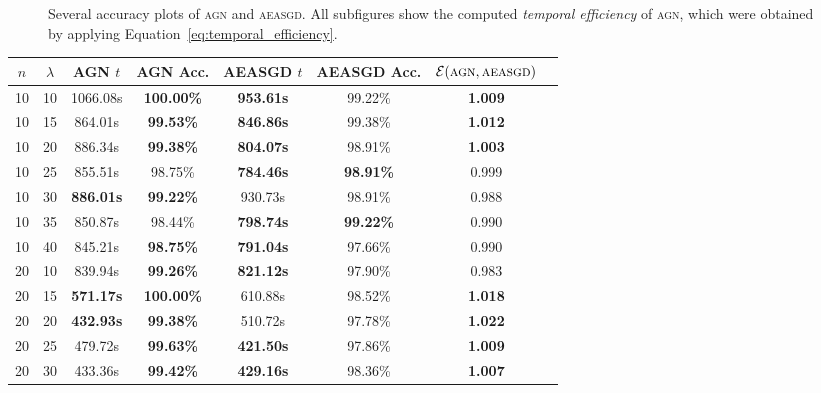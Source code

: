 \documentclass[wcp]{jmlr}
\begin{document}
\begin{figure}
  \centering
  \caption{Several accuracy plots of \textsc{agn} and \textsc{aeasgd}. All subfigures show the computed \emph{temporal efficiency} of \textsc{agn}, which were obtained by applying Equation~\ref{eq:temporal_efficiency}.}
\end{figure}

\begin{table}
  \centering
  \begin{tabular}{|c|c|c|c|c|c|c|c|}
    \hline
    $n$ & $\lambda$ & \textsc{AGN} $t$ & \textsc{AGN} Acc. & \textsc{AEASGD} $t$ & \textsc{AEASGD} Acc. & $\mathcal{E}(\textsc{agn},\textsc{aeasgd})$ \\
    \hline
    \hline
10 & 10 & 1066.08s & \textbf{100.00\%} & \textbf{953.61s} & 99.22\% & \textbf{1.009} \\
\hline
10 & 15 & 864.01s & \textbf{99.53\%} & \textbf{846.86s} & 99.38\% & \textbf{1.012} \\
\hline
10 & 20 & 886.34s & \textbf{99.38\%} & \textbf{804.07s} & 98.91\% & \textbf{1.003} \\
\hline
10 & 25 & 855.51s & 98.75\% & \textbf{784.46s} & \textbf{98.91\%} & 0.999 \\
\hline
10 & 30 & \textbf{886.01s} & \textbf{99.22\%} & 930.73s & 98.91\% & 0.988 \\
\hline
10 & 35 & 850.87s & 98.44\% & \textbf{798.74s} & \textbf{99.22\%} & 0.990 \\
\hline
10 & 40 & 845.21s & \textbf{98.75\%} & \textbf{791.04s} & 97.66\% & 0.990 \\
\hline
20 & 10 & 839.94s & \textbf{99.26\%} & \textbf{821.12s} & 97.90\% &  0.983 \\
\hline
20 & 15 & \textbf{571.17s} & \textbf{100.00\%} & 610.88s & 98.52\% & \textbf{1.018} \\
\hline
20 & 20 & \textbf{432.93s} & \textbf{99.38\%} & 510.72s & 97.78\% & \textbf{1.022} \\
\hline
20 & 25 & 479.72s & \textbf{99.63\%} & \textbf{421.50s} & 97.86\%  & \textbf{1.009} \\
\hline
20 & 30 & 433.36s & \textbf{99.42\%} & \textbf{429.16s} & 98.36\% & \textbf{1.007} \\

\end{tabular}
\end{table}
\end{document}
